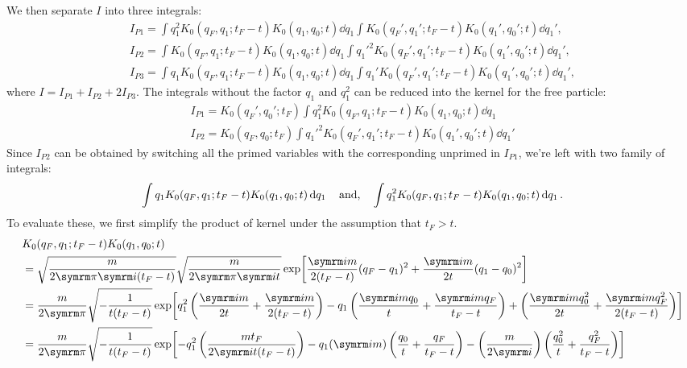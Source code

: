 We then separate $I$ into three integrals:
\begin{gather}
    I_{P1} = \int q_1^2K_0(q_F, q_1; t_F - t)K_0(q_1, q_0; t)\dd{q_1} \int K_0(q_F', q_1'; t_F - t)K_0(q_1', q_0'; t)\dd{q_1'}, \label{eq:spring_IP1}\\
    I_{P2} = \int K_0(q_F, q_1; t_F - t)K_0(q_1, q_0; t)\dd{q_1} \int q_1'^2K_0(q_F', q_1'; t_F - t)K_0(q_1', q_0'; t)\dd{q_1'}, \label{eq:spring_IP2}\\
    I_{P3} = \int q_1K_0(q_F, q_1; t_F - t)K_0(q_1, q_0; t)\dd{q_1} \int q_1'K_0(q_F', q_1'; t_F - t)K_0(q_1', q_0'; t) \dd{q_1'} \label{eq:spring_IP3},
\end{gather}
where $I = I_{P1} + I_{P2} + 2I_{P3}$. The integrals without the factor $q_1$ and $q_1^2$ can be reduced into the kernel for the free particle:
\begin{gather}
    I_{P1} = K_0(q_F', q_0'; t_F)\int q_1^2K_0(q_F, q_1; t_F - t)K_0(q_1, q_0; t)\dd{q_1} \\
    I_{P2} = K_0(q_F, q_0; t_F)\int q_1'^2 K_0(q_F', q_1'; t_F - t)K_0(q_1', q_0'; t)\dd{q_1'}
\end{gather}
Since $I_{P2}$ can be obtained by switching all the primed variables with the corresponding unprimed in $I_{P1}$, we're left with two family of integrals:
\begin{equation}
    \int q_1K_0(q_F, q_1; t_F - t)K_0(q_1, q_0; t)\dd{q_1} \quad\textrm{and,}\quad \int q_1^2K_0(q_F, q_1; t_F - t)K_0(q_1, q_0; t)\dd{q_1}. \label{eq:spring_family_of_integrals}
\end{equation}
To evaluate these, we first simplify the product of kernel under the assumption that $t_F > t$.
\begin{align}
    &K_0(q_F, q_1; t_F - t)K_0(q_1, q_0; t) \nonumber\\
    &= \sqrt{\frac{m}{2\cpi\im(t_F - t)}}\sqrt{\frac{m}{2\cpi\im t}}\exp[\frac{\im m}{2(t_F - t)}(q_F - q_1)^2 + \frac{\im m}{2t}(q_1 - q_0)^2] \\
    &= \frac{m}{2\cpi}\sqrt{-\frac{1}{t(t_F - t)}} \exp[q_1^2\left(\frac{\im m}{2t} + \frac{\im m}{2(t_F - t)}\right) - q_1\left(\frac{\im m q_0}{t} + \frac{\im m q_F}{t_F - t}\right) + \left(\frac{\im m q_0^2}{2t} + \frac{\im m q_F^2}{2(t_F - t)}\right)] \nonumber \\
    &= \frac{m}{2\cpi}\sqrt{-\frac{1}{t(t_F - t)}} \exp[-q_1^2\left(\frac{m t_F}{2\im t(t_F - t)}\right) - q_1(\im m)\left(\frac{q_0}{t} + \frac{q_F}{t_F - t}\right) - \left(\frac{m}{2\im}\right)\left(\frac{q_0^2}{t} + \frac{q_F^2}{t_F - t}\right)] \nonumber
\end{align}
